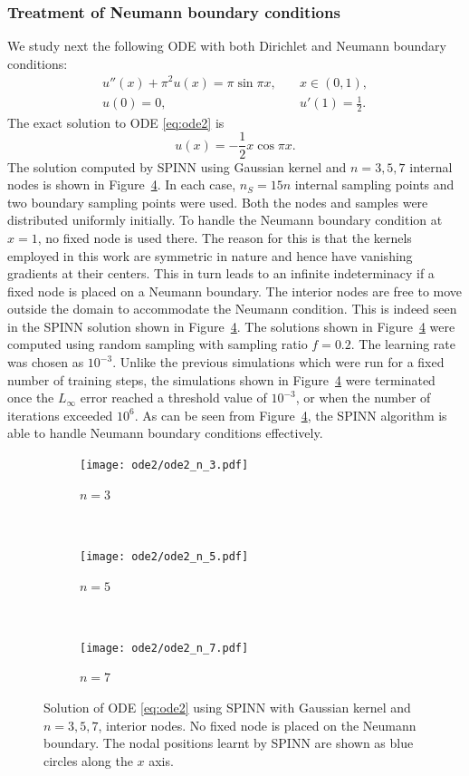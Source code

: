 \documentclass[12pt]{article}
\newcommand{\rb}[1]{#1}
\newcommand{\new}[1]{#1}
\begin{document}
\subsubsection{Treatment of Neumann boundary conditions}
We study next the following ODE with both Dirichlet and Neumann boundary conditions:
\begin{equation} \label{eq:ode2}
\begin{split}
u''(x) + \pi^2 u(x) = \pi \sin \pi x, &\quad x \in (0,1),\\
u(0) = 0, &\quad u'(1) = \frac{1}{2}.
\end{split}
\end{equation}
The exact solution to ODE \eqref{eq:ode2} is
\begin{equation} \label{eq:ode2_exact}
u(x) = -\frac{1}{2}x\cos \pi x.
\end{equation}
\new{The solution computed by SPINN using Gaussian kernel and $n=3,5,7$ internal nodes is shown in Figure~\ref{fig:spinn_ode2}.} \rb{In each case, $n_S = 15n$ internal sampling points and two boundary sampling points were used. Both the nodes and samples were distributed uniformly initially.} To handle the Neumann boundary condition at $x=1$, no fixed node is used there. \new{The reason for this is that the kernels employed in this work are symmetric in nature and hence have vanishing gradients at their centers. This in turn leads to an infinite indeterminacy if a fixed node is placed on a Neumann boundary.} The interior nodes are free to move outside the domain to accommodate the Neumann condition. This is indeed seen in the SPINN solution shown in Figure~\ref{fig:spinn_ode2}. \rb{The solutions shown in Figure~\ref{fig:spinn_ode2} were computed using random sampling with sampling ratio $f=0.2$. The learning rate was chosen as $10^{-3}$. Unlike the previous simulations which were run for a fixed number of training steps, the simulations shown in Figure~\ref{fig:spinn_ode2} were terminated once the $L_\infty$ error reached a threshold value of $10^{-3}$, or when the number of iterations exceeded $10^6$.} \new{As can be seen from Figure~\ref{fig:spinn_ode2}, the SPINN algorithm is able to handle Neumann boundary conditions effectively.}

\begin{figure}
\centering
\begin{subfigure}{0.3\textwidth}
\texttt{[image: ode2/ode2\_n\_3.pdf]}
\caption{$n = 3$}
\label{fig:ode2_n_3}
\end{subfigure}
~
\begin{subfigure}{0.3\textwidth}
\texttt{[image: ode2/ode2\_n\_5.pdf]}
\caption{$n = 5$}
\label{fig:ode2_n_5}
\end{subfigure}
~
\begin{subfigure}{0.3\textwidth}
\texttt{[image: ode2/ode2\_n\_7.pdf]}
\caption{$n = 7$}
\label{fig:ode2_n_7}
\end{subfigure}
\caption{Solution of ODE \eqref{eq:ode2} using SPINN with Gaussian kernel and $n = 3, 5, 7$, interior nodes. No fixed node is placed on the Neumann boundary. The nodal positions learnt by SPINN are shown as blue circles along the $x$ axis.}
\label{fig:spinn_ode2}
\end{figure}
\end{document}
